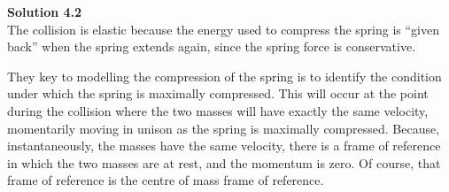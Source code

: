 \begin{framed}
\textbf{Solution 4.2}\\
The collision is elastic because the energy used to compress the spring is ``given back'' when the spring extends again, since the spring force is conservative.

They key to modelling the compression of the spring is to identify the condition under which the spring is maximally compressed. This will occur at the point during the collision where the two masses will have exactly the same velocity, momentarily moving in unison as the spring is maximally compressed. Because, instantaneously, the masses have the same velocity, there is a frame of reference in which the two masses are at rest, and the momentum is zero. Of course, that frame of reference is the centre of mass frame of reference.


\end{framed}
